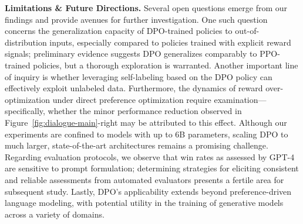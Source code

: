 \textbf{Limitations \& Future Directions.} Several open questions emerge from our findings and provide avenues for further investigation. One such question concerns the generalization capacity of DPO-trained policies to out-of-distribution inputs, especially compared to policies trained with explicit reward signals; preliminary evidence suggests DPO generalizes comparably to PPO-trained policies, but a thorough exploration is warranted. Another important line of inquiry is whether leveraging self-labeling based on the DPO policy can effectively exploit unlabeled data. Furthermore, the dynamics of reward over-optimization under direct preference optimization require examination—specifically, whether the minor performance reduction observed in Figure~\ref{fig:dialogue-main}-right may be attributed to this effect. Although our experiments are confined to models with up to 6B parameters, scaling DPO to much larger, state-of-the-art architectures remains a promising challenge. Regarding evaluation protocols, we observe that win rates as assessed by GPT-4 are sensitive to prompt formulation; determining strategies for eliciting consistent and reliable assessments from automated evaluators presents a fertile area for subsequent study. Lastly, DPO’s applicability extends beyond preference-driven language modeling, with potential utility in the training of generative models across a variety of domains. 

